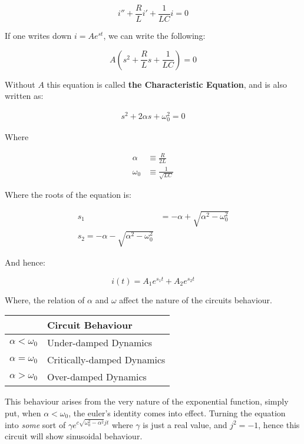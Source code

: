 \documentclass[11pt,a4paper]{book}
\begin{document}
\begin{equation}
i'' + \frac{R}{L} i' + \frac{1}{LC} i = 0
\end{equation}

If one writes down $i = Ae^{st}$, we can write the following:

\begin{equation}
A\left(s^2 + \frac{R}{L}s + \frac{1}{LC}\right) =0
\end{equation}

Without $A$ this equation is called \textbf{the Characteristic Equation}, and is also written as:

\begin{align}
s^2 + 2 \alpha s + \omega_0^2 = 0
\end{align}

Where

\begin{align}
\alpha &\equiv \frac{R}{2L}\\
\omega_0 &\equiv \frac{1}{\sqrt{LC}}
\end{align}

Where the roots of the equation is:

\begin{align}
s_1 &= - \alpha + \sqrt{\alpha^2 - \omega_0^2}\\
s_2 = - \alpha - \sqrt{\alpha^2 - \omega_0^2}
\end{align}

And hence:

\begin{equation}
i(t) = A_1e^{s_1t} + A_2e^{s_2t}
\end{equation}

Where, the relation of $\alpha$ and $\omega$ affect the nature of the circuits behaviour.


\begin{table}[httb]
\begin{tabular}{ll}
& Circuit Behaviour\\
\toprule
$\alpha < \omega_0$ & Under-damped Dynamics\\
$\alpha = \omega_0$ & Critically-damped Dynamics\\
$\alpha > \omega_0$ & Over-damped Dynamics\\
\bottomrule
\end{tabular}
\end{table}

This behaviour arises from the very nature of the exponential function, simply put, when $\alpha < \omega_0$, the euler's identity comes into effect. Turning the equation into \textit{some} sort of $\gamma e^{c{\sqrt{\omega_0^2 - \alpha^2}}jt}$ where $\gamma$ is just a real value, and $j^2 = -1$, hence this circuit will show sinusoidal behaviour. \\
\end{document}
